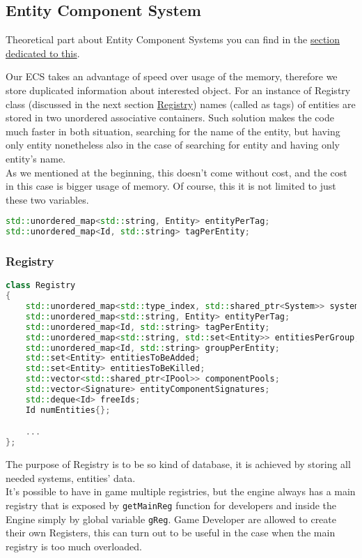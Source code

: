 \subsection{Entity Component System}
Theoretical part about Entity Component Systems you can find in the \hyperref[sec:theory_ecs]{section dedicated to this}.

Our ECS takes an advantage of speed over usage of the memory, therefore we store duplicated information about interested object. For an instance of Registry class (discussed in the next section \hyperref[sec:registry]{Registry}) names (called as tags) of entities are stored in two unordered associative containers. Such solution makes the code much faster in both situation, searching for the name of the entity, but having only entity nonetheless also in the case of searching for entity and having only entity's name.\\
As we mentioned at the beginning, this doesn't come without cost, and the cost in this case is bigger usage of memory.
Of course, this it is not limited to just these two variables.\\

\begin{lstlisting}[language=c++, caption=Entities name (./engine/include/tsengine/ecs/ecs.h)]
std::unordered_map<std::string, Entity> entityPerTag;
std::unordered_map<Id, std::string> tagPerEntity;
\end{lstlisting}

\newpage

\subsubsection{Registry}
\label{sec:registry}
\begin{lstlisting}[language=c++, caption=Registry class]
class Registry
{
    std::unordered_map<std::type_index, std::shared_ptr<System>> systems;
    std::unordered_map<std::string, Entity> entityPerTag;
    std::unordered_map<Id, std::string> tagPerEntity;
    std::unordered_map<std::string, std::set<Entity>> entitiesPerGroup;
    std::unordered_map<Id, std::string> groupPerEntity;
    std::set<Entity> entitiesToBeAdded;
    std::set<Entity> entitiesToBeKilled;
    std::vector<std::shared_ptr<IPool>> componentPools;
    std::vector<Signature> entityComponentSignatures;
    std::deque<Id> freeIds;
    Id numEntities{};

    ...
};
\end{lstlisting}
The purpose of Registry is to be so kind of database, it is achieved by storing all needed systems, entities' data.\\
It's possible to have in game multiple registries, but the engine always has a main registry that is exposed by \texttt{getMainReg} function for developers and inside the Engine simply by global variable \texttt{gReg}.
Game Developer are allowed to create their own Registers, this can turn out to be useful in the case when the main registry is too much overloaded.

